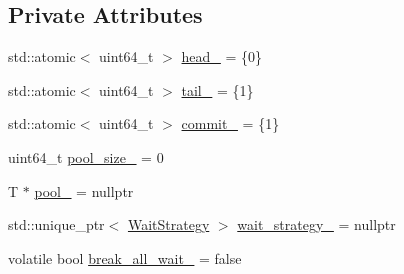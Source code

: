 \subsection*{Private Attributes}
\begin{DoxyCompactItemize}
\item 
std\-::atomic$<$ uint64\-\_\-t $>$ \hyperlink{classapollo_1_1cyber_1_1base_1_1BoundedQueue_afcb7d1df454d64b1b480caf678af1a10}{head\-\_\-} = \{0\}
\item 
std\-::atomic$<$ uint64\-\_\-t $>$ \hyperlink{classapollo_1_1cyber_1_1base_1_1BoundedQueue_a9b0101e530013d6587259b40a5937b2d}{tail\-\_\-} = \{1\}
\item 
std\-::atomic$<$ uint64\-\_\-t $>$ \hyperlink{classapollo_1_1cyber_1_1base_1_1BoundedQueue_a8ea7d0921f586ec3bbd616967fe7f5a3}{commit\-\_\-} = \{1\}
\item 
uint64\-\_\-t \hyperlink{classapollo_1_1cyber_1_1base_1_1BoundedQueue_a05a534d5530191d523f8d5a976dbae31}{pool\-\_\-size\-\_\-} = 0
\item 
T $\ast$ \hyperlink{classapollo_1_1cyber_1_1base_1_1BoundedQueue_ab7651509420fec29fb2f9fb013bd8df3}{pool\-\_\-} = nullptr
\item 
std\-::unique\-\_\-ptr$<$ \hyperlink{classapollo_1_1cyber_1_1base_1_1WaitStrategy}{Wait\-Strategy} $>$ \hyperlink{classapollo_1_1cyber_1_1base_1_1BoundedQueue_a123bf235b77d2927e4319b0ceb3dc45c}{wait\-\_\-strategy\-\_\-} = nullptr
\item 
volatile bool \hyperlink{classapollo_1_1cyber_1_1base_1_1BoundedQueue_a750b9ec4961d2e4da6b97cd79d866292}{break\-\_\-all\-\_\-wait\-\_\-} = false
\end{DoxyCompactItemize}


